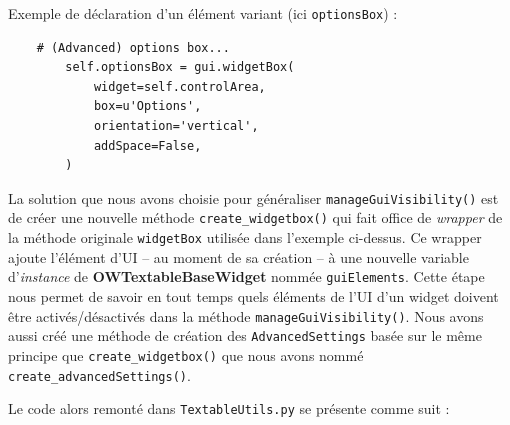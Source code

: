 \documentclass{article}
\begin{document}
\vspace{5mm}
Exemple de déclaration d'un élément variant (ici \texttt{optionsBox}) : 

\begin{verbatim}
    # (Advanced) options box...
        self.optionsBox = gui.widgetBox(
            widget=self.controlArea,
            box=u'Options',
            orientation='vertical',
            addSpace=False,
        )
\end{verbatim}

La solution que nous avons choisie pour généraliser \texttt{manageGuiVisibility()} est de créer une nouvelle méthode \texttt{create\_widgetbox()} qui fait office de \textit{wrapper} de la méthode originale \texttt{widgetBox} utilisée dans l'exemple ci-dessus. Ce wrapper ajoute l'élément d'UI – au moment de sa création – à une nouvelle variable d'\textit{instance} de \textbf{OWTextableBaseWidget} nommée \texttt{guiElements}. Cette étape nous permet de savoir en tout temps quels éléments de l'UI d'un widget doivent être activés/désactivés dans la méthode \texttt{manageGuiVisibility()}. Nous avons aussi créé une méthode de création des \texttt{AdvancedSettings} basée sur le même principe que \texttt{create\_widgetbox()} que nous avons nommé \texttt{create\_advancedSettings()}.

\vspace{5mm}
Le code alors remonté dans \texttt{TextableUtils.py} se présente comme suit : 
\end{document}
